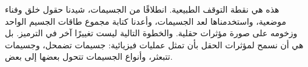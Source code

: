 \begin{classroomqa}
\end{classroomqa}

هذه هي نقطة التوقف الطبيعية. انطلاقًا من الجسيمات، شيدنا حقول خلق وفناء موضعية، واستخدمناها لعد الجسيمات، وأعدنا كتابة مجموع طاقات الجسيم الواحد وزخومه على صورة مؤثرات حقلية. والخطوة التالية ليست تغييرًا آخر في الترميز. بل هي أن نسمح لمؤثرات الحقل بأن تمثل عمليات فيزيائية: جسيمات تضمحل، وجسيمات تتبعثر، وأنواع الجسيمات تتحول بعضها إلى بعض.

